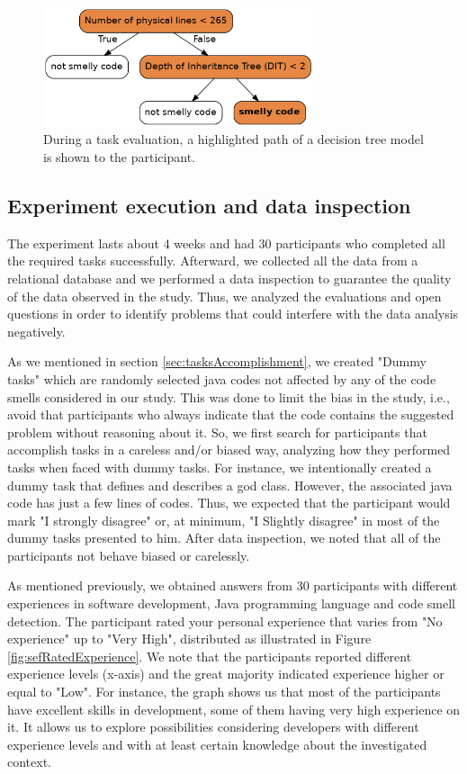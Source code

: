 \begin{figure}[H]
\centering
\includegraphics[width=300px]{figures/highlightedTree.png}
\caption{During a task evaluation, a highlighted path of a decision tree model is shown to the participant.}
\label{fig:highlightedDT}
\end{figure}
    
\subsection{Experiment execution and data inspection}

The experiment lasts about 4 weeks and had 30 participants who completed all the required tasks successfully. Afterward, we collected all the data from a relational database and we performed a data inspection to guarantee the quality of the data observed in the study. Thus, we analyzed the evaluations and open questions in order to identify problems that could interfere with the data analysis negatively.

As we mentioned in section \ref{sec:tasksAccomplishment}, we created "Dummy tasks" which are randomly selected java codes not affected by any of the code smells considered in our study. This was done to limit the bias \cite{palomba2014they} in the study, i.e., avoid that participants who always indicate that the code contains the suggested problem without reasoning about it. So, we first search for participants that accomplish tasks in a careless and/or biased way, analyzing how they performed tasks when faced with dummy tasks. For instance, we intentionally created a dummy task that defines and describes a god class. However, the associated java code has just a few lines of codes. Thus, we expected that the participant would mark "I strongly disagree" or, at minimum, "I Slightly disagree" in most of the dummy tasks presented to him. After data inspection, we noted that all of the participants not behave biased or carelessly. 

As mentioned previously, we obtained answers from 30 participants with different experiences in software development, Java programming language and code smell detection. The participant rated your personal experience that varies from "No experience" up to "Very High", distributed as illustrated in Figure \ref{fig:sefRatedExperience}. We note that the participants reported different experience levels (x-axis) and the great majority indicated experience higher or equal to "Low". For instance, the graph shows us that most of the participants have excellent skills in development, some of them having very high experience on it. It allows us to explore possibilities considering developers with different experience levels and with at least certain knowledge about the investigated context.

